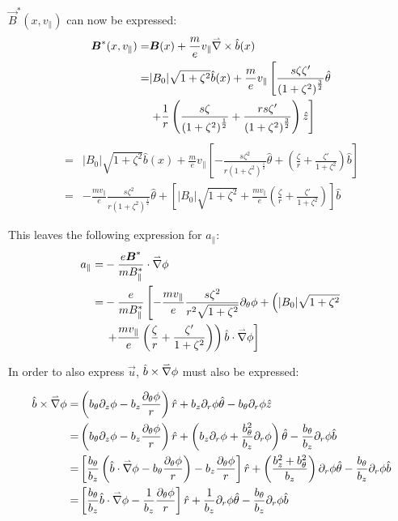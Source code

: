 $\vec{B}^*(x,v_\parallel)$ can now be expressed:
\begin{align*}
 \boldsymbol{B}^*(x,v_\parallel) =& \boldsymbol{B}(x) + \frac{m}{e}v_\parallel \accentset{\rightharpoonup}{\nabla} \times \hat{b}(x)\\
 =& |B_0|\sqrt{1+\zeta^2}\hat{b}(x) + \frac{m}{e}v_\parallel \left[\frac{s\zeta\zeta'}{\left(1+\zeta^2\right)^{\frac{3}{2}}}\hat{\theta}\right.\\
 & \left.+ \frac{1}{r}\left(\frac{s\zeta}{\left(1+\zeta^2\right)^{\frac{1}{2}}} + \frac{rs\zeta'}{\left(1+\zeta^2\right)^{\frac{3}{2}}}\right)\hat{z}\right]
\end{align*}
\begin{align*}
 =& |B_0|\sqrt{1+\zeta^2}\hat{b}(x) + \frac{m}{e}v_\parallel \left[- \frac{s\zeta^2}{r\left(1+\zeta^2\right)^{\frac{1}{2}}} \hat{\theta} + \left(\frac{\zeta}{r} + \frac{\zeta'}{1+\zeta^2}\right)\hat{b}\right]\\
 =& - \frac{mv_\parallel}{e}\frac{s\zeta^2}{r\left(1+\zeta^2\right)^{\frac{1}{2}}} \hat{\theta} + \left[|B_0|\sqrt{1+\zeta^2} + \frac{mv_\parallel}{e}\left(\frac{\zeta}{r} + \frac{\zeta'}{1+\zeta^2}\right)\right]\hat{b}
\end{align*}

This leaves the following expression for $a_\parallel$:
\begin{align}
a_\parallel =& - \frac{e\boldsymbol{B}^*}{mB_\parallel^*}\cdot\accentset{\rightharpoonup}{\nabla}\phi\nonumber\\
=& -\frac{e}{mB_\parallel^*}\left[-\frac{mv_\parallel}{e}\frac{s\zeta^2}{r^2\sqrt{1+\zeta^2}}\partial_\theta\phi + \left(|B_0|\sqrt{1+\zeta^2}\right.\right.\nonumber\\
&\left.\left.+\frac{mv_\parallel}{e}\left(\frac{\zeta}{r}+\frac{\zeta'}{1+\zeta^2}\right)\right)\hat{b}\cdot\accentset{\rightharpoonup}{\nabla}\phi\right]\label{eq::a_parallel def cylinder}
\end{align}

In order to also express $\vec{u}$, $\hat{b}\times\accentset{\rightharpoonup}{\nabla}\phi$ must also be expressed:

\begin{align*}
 \hat{b}\times\accentset{\rightharpoonup}{\nabla}\phi =& \left(b_\theta \partial_z\phi - b_z \frac{\partial_\theta \phi}{r} \right)\hat{r} + b_z \partial_r\phi \hat{\theta} - b_\theta \partial_r \phi \hat{z}\\
 =& \left(b_\theta \partial_z\phi - b_z \frac{\partial_\theta \phi}{r} \right)\hat{r} + \left(b_z \partial_r\phi + \frac{b_\theta^2}{b_z} \partial_r \phi\right) \hat{\theta} - \frac{b_\theta}{b_z} \partial_r \phi \hat{b}\\
 =& \left[\frac{b_\theta}{b_z}\left(\hat{b}\cdot\accentset{\rightharpoonup}{\nabla}\phi - b_\theta \frac{\partial_\theta\phi}{r}\right) - b_z \frac{\partial_\theta \phi}{r} \right]\hat{r} + \left(\frac{b_z^2 + b_\theta^2}{b_z} \right)  \partial_r\phi \hat{\theta} - \frac{b_\theta}{b_z} \partial_r \phi \hat{b}\\
 =& \left[\frac{b_\theta}{b_z}\hat{b}\cdot\accentset{\rightharpoonup}{\nabla}\phi - \frac{1}{b_z} \frac{\partial_\theta \phi}{r} \right]\hat{r} + \frac{1}{b_z}   \partial_r\phi \hat{\theta} - \frac{b_\theta}{b_z} \partial_r \phi \hat{b}\\
\end{align*}

